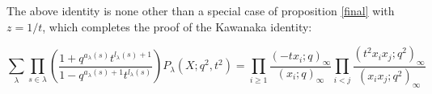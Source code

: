 \documentclass[12pt,dvips]{amsart}
\begin{document}
The above identity is none other than a special case of proposition \ref{final} with $z = 1/t$, which completes the proof of the Kawanaka identity:

$$ \sum_\lambda  \prod_{s \in \lambda}  \left ( \frac{1+q^{a_\lambda(s)}t^{l_\lambda(s)+1}}{1-q^{a_\lambda(s)+1}t^{l_\lambda(s)}} \right )
P_\lambda(X;q^2,t^2) = \prod_{i \geq 1} \frac{(-tx_i;q)_\infty}{(x_i;q)_\infty} \prod_{i<j} \frac{(t^2x_ix_j;q^2)_\infty}{(x_ix_j;q^2)_\infty} $$

\nocite{SPECIES}
\nocite{COLROT}	

\end{document}
